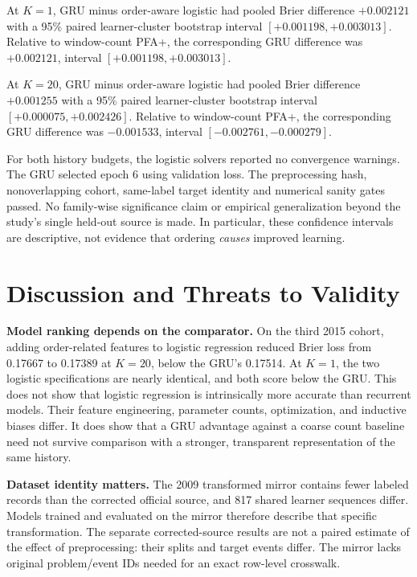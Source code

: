 \documentclass[11pt,a4paper]{article}
\begin{document}
At $K=1$, GRU minus order-aware logistic had pooled Brier difference $+0.002121$ with a 95\% paired learner-cluster bootstrap interval $[+0.001198,+0.003013]$. Relative to window-count PFA+, the corresponding GRU difference was $+0.002121$, interval $[+0.001198,+0.003013]$.

At $K=20$, GRU minus order-aware logistic had pooled Brier difference $+0.001255$ with a 95\% paired learner-cluster bootstrap interval $[+0.000075,+0.002426]$. Relative to window-count PFA+, the corresponding GRU difference was $-0.001533$, interval $[-0.002761,-0.000279]$.



For both history budgets, the logistic solvers reported no convergence warnings. The GRU selected epoch 6 using validation loss. The preprocessing hash, nonoverlapping cohort, same-label target identity and numerical sanity gates passed. No family-wise significance claim or empirical generalization beyond the study's single held-out source is made. In particular, these confidence intervals are descriptive, not evidence that ordering \emph{causes} improved learning.

\section{Discussion and Threats to Validity}
\textbf{Model ranking depends on the comparator.} On the third 2015 cohort, adding order-related features to logistic regression reduced Brier loss from 0.17667 to 0.17389 at $K=20$, below the GRU's 0.17514. At $K=1$, the two logistic specifications are nearly identical, and both score below the GRU. This does not show that logistic regression is intrinsically more accurate than recurrent models. Their feature engineering, parameter counts, optimization, and inductive biases differ. It does show that a GRU advantage against a coarse count baseline need not survive comparison with a stronger, transparent representation of the same history.

\textbf{Dataset identity matters.} The 2009 transformed mirror contains fewer labeled records than the corrected official source, and 817 shared learner sequences differ. Models trained and evaluated on the mirror therefore describe that specific transformation. The separate corrected-source results are not a paired estimate of the effect of preprocessing: their splits and target events differ. The mirror lacks original problem/event IDs needed for an exact row-level crosswalk.
\end{document}
